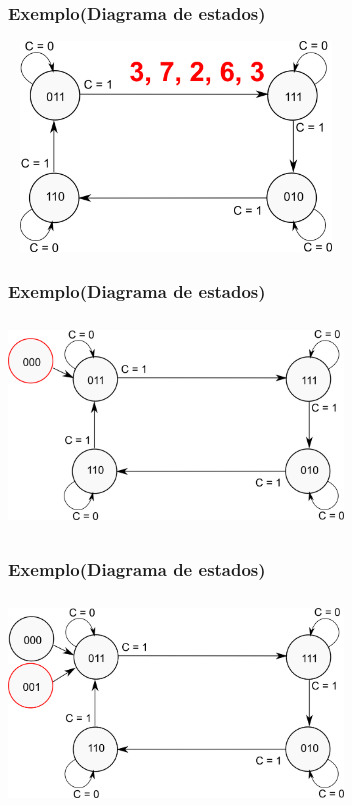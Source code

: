 \documentclass{beamer}
\begin{document}
\begin{frame}
  \frametitle{Exemplo(Diagrama de estados)}
  \begin{center}
    \includegraphics[height = 2.2in, width = 3.5in]
      {images/exemplo_projeto_5.png}
  \end{center}
\end{frame}

\begin{frame}
  \frametitle{Exemplo(Diagrama de estados)}
  \begin{center}
    \includegraphics[height = 2.2in, width = 3.5in]
      {images/exemplo_projeto_6.png}
  \end{center}
\end{frame}

\begin{frame}
  \frametitle{Exemplo(Diagrama de estados)}
  \begin{center}
    \includegraphics[height = 2.2in, width = 3.5in]
      {images/exemplo_projeto_7.png}
  \end{center}
\end{frame}
\end{document}
